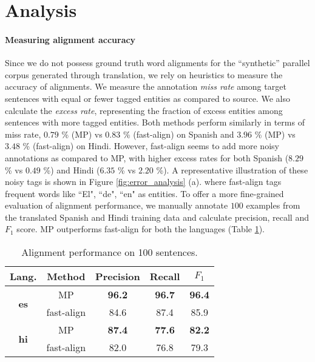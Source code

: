 \documentclass[11pt,a4paper]{article}
\begin{document}
\section{Analysis}


\paragraph{Measuring alignment accuracy}
Since we do not possess ground truth word alignments 
for the ``synthetic'' parallel corpus generated through translation, 
we rely on heuristics to measure the accuracy of alignments. 
We measure the annotation \emph{miss rate} among target sentences
with equal or fewer tagged entities as compared to source.
We also calculate the \emph{excess rate}, 
representing the fraction of excess entities 
among sentences with more tagged entities. 
Both methods perform similarly in terms of 
miss rate, $0.79$ \% (MP) vs $0.83$ \% (fast-align) 
on Spanish and $3.96$ \% (MP) vs $3.48$ \% (fast-align) on Hindi. 
However, fast-align seems 
to add 
more noisy annotations as compared to MP, 
with higher excess rates for both Spanish ($8.29$ \% vs $0.49$ \%) 
and Hindi ($6.35$ \% vs $2.20$ \%). 
A representative illustration of these noisy tags 
is shown in Figure \ref{fig:error_analysis} (a).
where fast-align tags frequent words like ``El", ``de", ``en" as entities.
To offer a more fine-grained evaluation of alignment performance, 
we manually annotate $100$ examples from 
the translated Spanish and Hindi training data 
and calculate precision, recall and $F_1$ score. 
MP outperforms fast-align for both the languages (Table \ref{tab:align-perf}).

\begin{table}[htb]
\small
\centering
\begin{tabularx}{220pt}{ccccc}
\toprule
\bf Lang. & \bf Method & \bf Precision & \bf Recall & \bf $F_1$ \\
\midrule
\multirow{2}{*}{\bf es} & MP & \bf 96.2 & \bf 96.7 & \bf 96.4 \\
 & fast-align & 84.6 & 87.4 & 85.9 \\
\midrule
\multirow{2}{*}{\bf hi} & MP & \bf 87.4 & \bf 77.6 & \bf 82.2 \\
& fast-align & 82.0 & 76.8 & 79.3 \\
\bottomrule
\end{tabularx}
\caption{Alignment performance on 100 sentences.}
\label{tab:align-perf}
\end{table}
\end{document}

